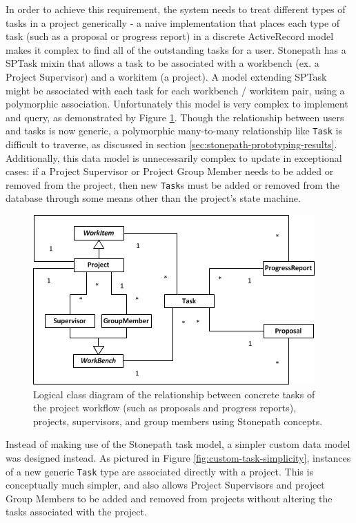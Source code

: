 \documentclass[document.tex]{subfiles}
\begin{document}
In order to achieve this requirement, the system needs to treat different types of tasks in a project generically - a naive implementation that places each type of task (such as a proposal or progress report) in a discrete ActiveRecord model makes it complex to find all of the outstanding tasks for a user. Stonepath has a SPTask mixin that allows a task to be associated with a workbench (ex. a Project Supervisor) and a workitem (a project). A model extending SPTask might be associated with each task for each workbench / workitem pair, using a polymorphic association. Unfortunately this model is very complex to implement and query, as demonstrated by Figure \ref{fig:sptask-complexity}. Though the relationship between users and tasks is now generic, a polymorphic many-to-many relationship like \verb!Task! is difficult to traverse, as discussed in section \ref{sec:stonepath-prototyping-results}. Additionally, this data model is unnecessarily complex to update in exceptional cases: if a Project Supervisor or Project Group Member needs to be added or removed from the project, then new \verb!Task!s must be added or removed from the database through some means other than the project’s state machine.

\begin{figure}[!htbp]
\centering \includegraphics{./img/case-study-fourth-year-system/task-with-sptask-static-structure}
\caption{Logical class diagram of the relationship between concrete tasks of the project workflow (such as proposals and progress reports), projects, supervisors, and group members using Stonepath concepts.}
\label{fig:sptask-complexity}
\end{figure}

Instead of making use of the Stonepath task model, a simpler custom data model was designed instead. As pictured in Figure \ref{fig:custom-task-simplicity}, instances of a new generic \verb!Task! type are associated directly with a project. This is conceptually much simpler, and also allows Project Supervisors and project Group Members to be added and removed from projects without altering the tasks associated with the project.
\end{document}
